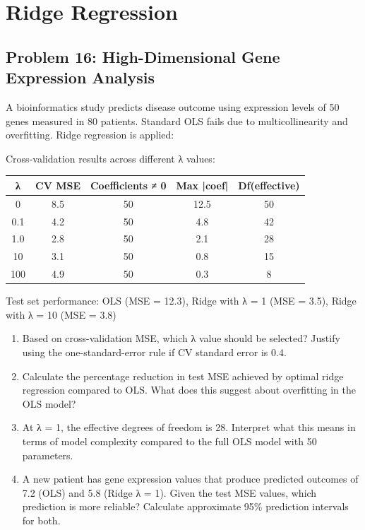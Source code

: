 \documentclass[12pt]{article}
\begin{document}

\section{Ridge Regression}

\subsection*{Problem 16: High-Dimensional Gene Expression Analysis}

A bioinformatics study predicts disease outcome using expression levels of 50 genes measured in 80 patients. Standard OLS fails due to multicollinearity and overfitting. Ridge regression is applied:

Cross-validation results across different λ values:
\begin{center}
\begin{tabular}{ccccc}
\toprule
λ & CV MSE & Coefficients ≠ 0 & Max |coef| & Df(effective) \\
\midrule
0 & 8.5 & 50 & 12.5 & 50 \\
0.1 & 4.2 & 50 & 4.8 & 42 \\
1.0 & 2.8 & 50 & 2.1 & 28 \\
10 & 3.1 & 50 & 0.8 & 15 \\
100 & 4.9 & 50 & 0.3 & 8 \\
\bottomrule
\end{tabular}
\end{center}

Test set performance: OLS (MSE = 12.3), Ridge with λ = 1 (MSE = 3.5), Ridge with λ = 10 (MSE = 3.8)

\begin{enumerate}[label=(\alph*)]
\item Based on cross-validation MSE, which λ value should be selected? Justify using the one-standard-error rule if CV standard error is 0.4.

\item Calculate the percentage reduction in test MSE achieved by optimal ridge regression compared to OLS. What does this suggest about overfitting in the OLS model?

\item At λ = 1, the effective degrees of freedom is 28. Interpret what this means in terms of model complexity compared to the full OLS model with 50 parameters.

\item A new patient has gene expression values that produce predicted outcomes of 7.2 (OLS) and 5.8 (Ridge λ = 1). Given the test MSE values, which prediction is more reliable? Calculate approximate 95\% prediction intervals for both.
\end{enumerate}
\end{document}
